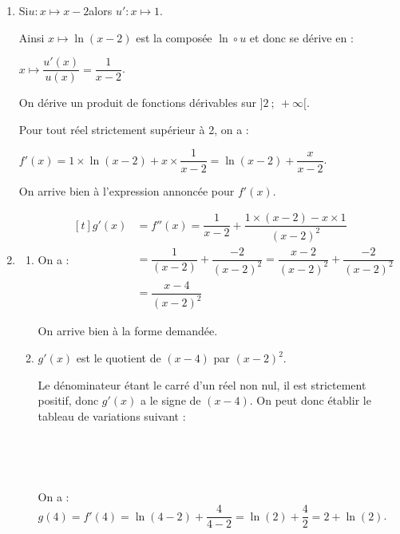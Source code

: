 \begin{enumerate}
Cela confirme à la fois la conjecture sur la limite en 2 (en effet, comme $f$ n'est définie que sur $]2~;~+\infty]$, la limite en 2 est la limite à droite en 2), et cela confirme aussi la conjecture sur l'asymptote d'équation $x = 2$, qui est l'interprétation graphique de cette limite.

	\item Si\quad $u : x \longmapsto x - 2$\quad alors $u' : x \longmapsto 1$.

Ainsi \quad $x \longmapsto \ln(x-2)$ \quad est la composée $\ln \circ u$ et donc se dérive en :

$x \longmapsto \dfrac{u'(x)}{u(x)} = \dfrac{1}{x-2}$.

On dérive un produit de fonctions dérivables sur $]2~;~+\infty[$.

Pour tout réel strictement supérieur à 2, on a :

$f'(x) = 1 \times \ln(x - 2) + x \times \dfrac{1}{x - 2} = \ln(x-2) + \dfrac{x}{x - 2}$.

On arrive bien à l'expression annoncée pour $f'(x)$.

	\item \begin{enumerate}
		\item On a :\quad $\begin{aligned}[t]
			g'(x) &= f''(x) = \dfrac{1}{x - 2} + \dfrac{1 \times (x-2) - x \times 1}{(x-2)^2}\\
			&= \dfrac{1}{(x-2)} + \dfrac{-2}{(x-2)^2} = \dfrac{x-2}{(x-2)^2} + \dfrac{-2}{(x-2)^2}\\
			& = \dfrac{x - 4}{(x-2)^2}
		\end{aligned}$

On arrive bien à la forme demandée.

		\item $g'(x)$ est le quotient de $(x-4)$ par $(x-2)^2$.

Le dénominateur étant le carré d'un réel non nul, il est strictement positif, donc $g'(x)$ a le signe de $(x - 4)$. On peut donc établir le tableau de variations suivant :

\hfill~\hfill~

On a :\quad $g(4) = f'(4) = \ln(4 - 2) + \dfrac{4}{4 - 2} = \ln(2) + \dfrac{4}{2} = 2 + \ln (2)$.


\end{enumerate}
\end{enumerate}
